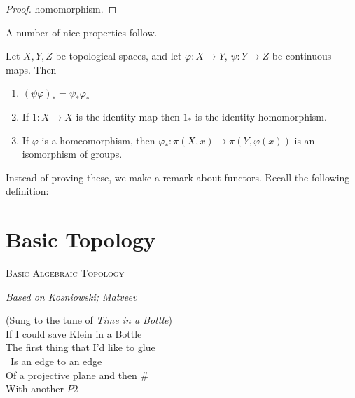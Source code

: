 \documentclass{fkbook}
\begin{document}
\begin{adjustwidth}{1em}{1em}
\begin{proof}
    homomorphism.
  \end{proof}
  A number of nice properties follow.
  \begin{theorem}
    Let $X,Y,Z$ be topological spaces, and let $\varphi : X \to Y$,
    $\psi : Y \to Z$ be continuous maps. Then
    \begin{enumerate}[label=\arabic*)]
      \item $(\psi \varphi)_* = \psi_* \varphi_*$
      \item If $1 : X \to X$ is the identity map then $1_*$ is the
        identity homomorphism.
      \item If $\varphi$ is a homeomorphism, then $\varphi_* :
        \pi(X,x) \to \pi(Y, \varphi(x))$ is an isomorphism of groups.
    \end{enumerate}
  \end{theorem}
  Instead of proving these, we make a remark about functors. Recall
  the following definition:
\end{adjustwidth}

\chapter{Basic Topology}
\begin{center}
  {\scshape \Large Basic Algebraic Topology}

  {\itshape Based on Kosniowski; Matveev}
\end{center}
\vspace{-.1cm}
\hrulefill

\begin{center}
  \begin{minipage}[H]{.4\linewidth}
  (Sung to the tune of \emph{Time in a Bottle}) \\
  If I could save Klein in a Bottle \\
  The first thing that I'd like to glue\\\
  Is an edge to an edge\\
  Of a projective plane and then $\#$ \\
  With another $P2$
  \end{minipage}
\end{center}
\end{document}
